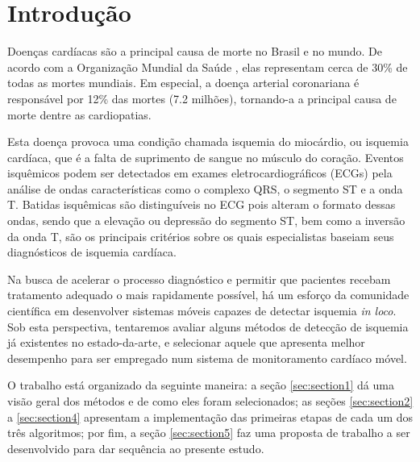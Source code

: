 
\section*{Introdução}
\label{sec:intro}

Doenças cardíacas são a principal causa de morte no Brasil e no mundo. De acordo com a Organização Mundial da Saúde \cite{Who04}, elas representam cerca de 30\% de todas as mortes mundiais. Em especial, a doença arterial coronariana é responsável por 12\% das mortes (7.2 milhões), tornando-a a principal causa de morte dentre as cardiopatias.

Esta doença provoca uma condição chamada isquemia do miocárdio, ou isquemia cardíaca, que é a falta de suprimento de sangue no músculo do coração. Eventos isquêmicos podem ser detectados em exames eletrocardiográficos (ECGs) pela análise de ondas características como o complexo QRS, o segmento ST e a onda T. Batidas isquêmicas são distinguíveis no ECG pois alteram o formato dessas ondas, sendo que a elevação ou depressão do segmento ST, bem como a inversão da onda T, são os principais critérios sobre os quais especialistas baseiam seus diagnósticos de isquemia cardíaca.

Na busca de acelerar o processo diagnóstico e permitir que pacientes recebam tratamento adequado o mais rapidamente possível, há um esforço da comunidade científica em desenvolver sistemas móveis capazes de detectar isquemia \emph{in loco}. Sob esta perspectiva, tentaremos avaliar alguns métodos de detecção de isquemia já existentes no estado-da-arte, e selecionar aquele que apresenta melhor desempenho para ser empregado num sistema de monitoramento cardíaco móvel.

O trabalho está organizado da seguinte maneira: a seção \ref{sec:section1} dá uma visão geral dos métodos e de como eles foram selecionados; as seções \ref{sec:section2} a \ref{sec:section4} apresentam a implementação das primeiras etapas de cada um dos três algoritmos; por fim, a seção \ref{sec:section5} faz uma proposta de trabalho a ser desenvolvido para dar sequência ao presente estudo.
